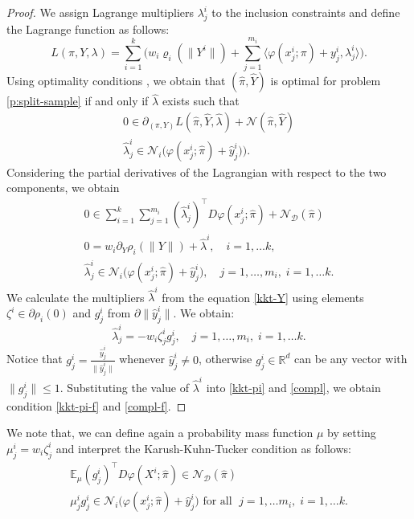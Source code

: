 \documentclass[10pt,letterpaper]{article}
\newcommand{\R}{\mathbb{R}}
\newcommand{\Dc}{\mathcal{D}}
\newcommand{\1}{1{\hskip -2.55 pt}\hbox{I}}
\newtheorem{proof}{Proof}
\begin{document}
\begin{proof}
We assign Lagrange multipliers $\lambda^i_j$ to the inclusion constraints and define the Lagrange function as follows:
\[
L(\pi, Y,\lambda) = \sum_{i=1}^k \Big( w_i\varrho_i(\|Y^i\|) + \sum_{j=1}^{m_i} \big\langle \varphi(x^i_j;\pi)+{y}^i_j , \lambda^i_j\big\rangle \Big).
\]
Using optimality conditions \cite[Theorem 3.4]{BonnansShapiro}, we obtain that $(\hat{\pi},\hat{Y})$ is optimal for problem \eqref{p:split-sample} if and only if
$\hat{\lambda}$ exists such that
\begin{gather*}
0\in \partial_{(\pi,Y)} L(\hat{\pi},\hat{Y},\hat{\lambda}) +\mathcal{N}(\hat{\pi},\hat{Y})\\
\hat{\lambda}^i_j \in \mathcal N_i \big(\varphi(x^i_j;\hat{\pi}) +\hat{y}^i_j) \big).
\end{gather*} 
Considering the partial derivatives of the Lagrangian with respect to the two components, we obtain
\begin{gather}
0\in  \sum_{i=1}^k  \sum_{j=1}^{m_i}  (\hat{\lambda}^i_j)^\top D\varphi(x^i_j;\hat{\pi})+\mathcal N_{\Dc} (\hat{\pi})\label{kkt-pi}\\
0= w_i\partial_Y \rho_i (\|Y\|) +\hat{\lambda}^i,\quad i=1,\dots k,\label{kkt-Y}\\
\hat{\lambda}^i_j\in \mathcal N_i\big(\varphi(x^i_j;\hat{\pi}) +\hat{y}^i_j \big) , \quad j=1,\dots, m_i,\; i=1,\dots k. \label{compl}
\end{gather} 
We calculate the multipliers $\hat{\lambda}^i $ from the equation \eqref{kkt-Y} using elements $\zeta^i\in \partial \rho_i (0)$ and $g^i_j$ from
$\partial \|\hat{y}^i_j\|$. We obtain:
\[
\hat{\lambda}^i_j= - w_i \zeta^i_j g^i_j,\quad j=1,\dots, m_i,\; i=1,\dots k.
\]
Notice that $ g^i_j = \frac{\hat{y}^i_j}{\|\hat{y}^i_j\|}$ whenever $\hat{y}^i_j \ne 0$, otherwise $g^i_j\in\R^d$ can be any vector 
with $\|g^i_j\|\leq 1$. 
Substituting the value of $\hat{\lambda}^i $ into \eqref{kkt-pi} and \eqref{compl}, we obtain condition \eqref{kkt-pi-f} and \eqref{compl-f}. 
\end{proof}

We note that, we can define again a probability mass function $\mu$ by setting $\mu^i_j= w_i\zeta^i_j$ and interpret the Karush-Kuhn-Tucker condition
as follows: 
\begin{gather*}
\mathbb{E}_{\mu} (g^i_j)^\top  D\varphi(X^i;\hat{\pi}) \in \mathcal N_{\Dc}(\hat{\pi})\\
\mu^i_j g^i_j \in \mathcal N_i\big(\varphi(x^i_j;\hat{\pi})+\hat{y}^i_j \big) \text{ for all  }\; j=1,\dots m_i,\; i=1,\dots k.
\end{gather*}
\end{document}
